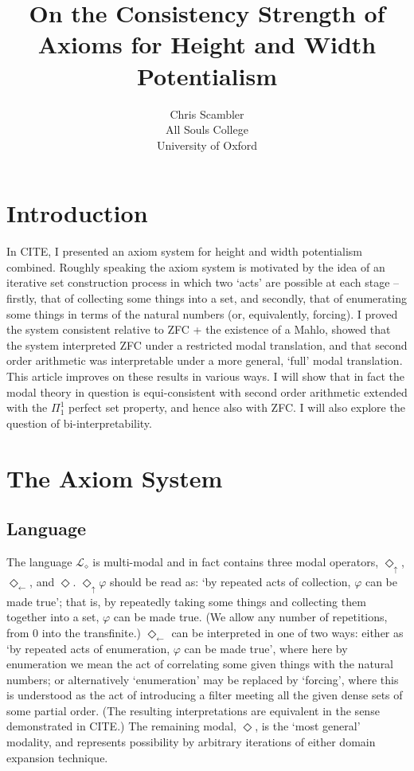 \documentclass{article}
\title{On the Consistency Strength of Axioms for Height and Width Potentialism}
\author{Chris Scambler 
\\
All Souls College\\
University of Oxford}
\theoremstyle{definition}
\newcommand{\du}{\Diamond_\uparrow}
\newcommand{\dl}{\Diamond_\leftarrow}
\begin{document}
 
\maketitle

\section{Introduction}
In CITE, I presented an axiom system for height and width potentialism combined. 
Roughly speaking the axiom system is motivated by the idea of an iterative set 
construction process in which two `acts' are possible at each stage -- 
firstly, that of collecting some things 
into a set, and secondly, that of enumerating some things in terms of the natural 
numbers (or, equivalently, forcing). I proved the system consistent relative 
to ZFC + the existence of a Mahlo, showed that the system interpreted ZFC under a restricted
modal translation, and that second order arithmetic was interpretable under a 
more general, `full' modal translation. This article improves on these results in various ways.
I will show that in fact the modal theory in question is equi-consistent with second order 
arithmetic extended with the $\Pi_1^1$ perfect set property, and hence also with ZFC.
I will also explore the question of bi-interpretability.

\section{The Axiom System}
\subsection{Language}
The language $\mathcal{L}_\diamond$ is multi-modal and in fact contains three modal 
operators, $\du$, $\dl$, and $\Diamond$. $\du \varphi$ should be read as: `by repeated 
acts of collection, $\varphi$ can be made true'; that is, by repeatedly taking some things 
and collecting them together into a set, $\varphi$ can be made true. 
(We allow any number of repetitions, from $0$ into the transfinite.) 
$\dl$ can be interpreted in one of two ways: either as `by repeated acts of enumeration, 
$\varphi$ can be made true', where here by enumeration we mean the act of correlating 
some given things with the natural numbers; or alternatively `enumeration' 
may be replaced by `forcing', where this is understood as the act of 
introducing a filter meeting all the given dense sets of some partial order.
(The resulting interpretations are equivalent in the sense demonstrated in 
CITE.) The remaining modal, $\Diamond$, is the `most general' modality, 
and represents possibility by arbitrary iterations of either domain expansion technique. 
\end{document}
